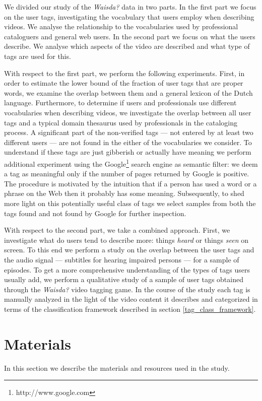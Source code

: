 We divided our study of the \emph{Waisda?} data in two parts. In the first
part we focus on the user tags, investigating the vocabulary that users employ
when describing videos. We analyse the relationship to the vocabularies used
by professional cataloguers and general web users. In the second part we focus
on what the users describe. We analyse which aspects of the video are
described and what type of tags are used for this.

With respect to the first part, we perform the following experiments. First, in order to estimate the lower bound of the fraction of user tags that are proper words, we examine the overlap between them and a general lexicon of the Dutch language. Furthermore, to determine if
users and professionals use different vocabularies when describing videos, we
investigate the overlap between all user tags and a typical domain thesaurus
used by professionals in the cataloging process. A significant part of the
non-verified tags --- not entered by at least two different users --- are not
found in the either of the vocabularies we consider. To understand if these
tags are just gibberish or actually have meaning we perform additional
experiment using the Google\footnote{http://www.google.com} search engine as
semantic filter: we deem a tag as meaningful only if the number of pages
returned by Google is positive. The procedure is motivated by the intuition
that if a person has used a word or a phrase on the Web then it probably has
some meaning. Subsequently, to shed more light on this potentially useful
class of tags we select samples from both the tags found and not found by
Google for further inspection.

With respect to the second part, we take a combined approach. First, we
investigate what do users tend to describe more: things \textit{heard} or
things \textit{seen} on screen. To this end we perform a study on the overlap
between the user tags and the audio signal --- subtitles for hearing impaired
persons --- for a sample of episodes. To get a more comprehensive
understanding of the types of tags users usually add, we perform a qualitative
study of a sample of user tags obtained through the \emph{Waisda?} video
tagging game. In the course of the study each tag is manually analyzed in the
light of the video content it describes and categorized in terms of the
classification framework described in section \ref{tag_class_framework}.

\section{Materials}\label{sec:materials}
In this section we describe the materials and resources used in the study.


